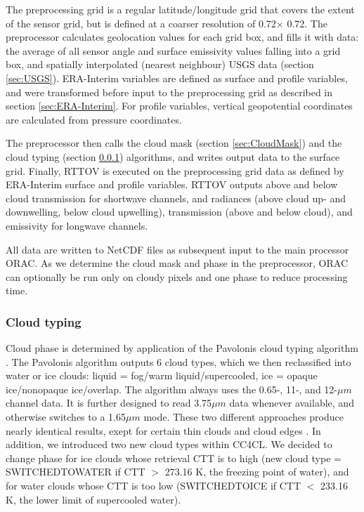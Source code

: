 The preprocessing grid is a regular latitude/longitude grid that covers the extent of the sensor grid, but is defined at a coarser resolution of 0.72\textdegree $\times$ 0.72\textdegree. The preprocessor calculates geolocation values for each grid box, and fills it with data: the average of all sensor angle and surface emissivity values falling into a grid box, and spatially interpolated (nearest neighbour) USGS data (section \ref{sec:USGS}). ERA-Interim variables are defined as surface and profile variables, and were transformed before input to the preprocessing grid as described in section \ref{sec:ERA-Interim}. For profile variables, vertical geopotential coordinates are calculated from pressure coordinates. 

The preprocessor then calls the cloud mask (section \ref{sec:CloudMask}) and the cloud typing (section \ref{sec:Pavolonis}) algorithms, and writes output data to the surface grid. Finally, RTTOV is executed on the preprocessing grid data as defined by ERA-Interim surface and profile variables. RTTOV outputs above and below cloud transmission for shortwave channels, and radiances (above cloud up- and downwelling, below cloud upwelling), transmission (above and below cloud), and emissivity for longwave channels.

All data are written to NetCDF files as subsequent input to the main processor ORAC. As we determine the cloud mask and phase in the preprocessor, ORAC can optionally be run only on cloudy pixels and one phase to reduce processing time.

\subsubsection{Cloud typing}\label{sec:Pavolonis}

Cloud phase is determined by application of the Pavolonis cloud typing algorithm \citep{Pavolonis05}. The Pavolonis algorithm outputs 6 cloud types, which we then reclassified into water or ice clouds: liquid = fog/warm liquid/supercooled, ice = opaque ice/nonopaque ice/overlap. The algorithm always uses the 0.65-, 11-, and 12-$\mu m$ channel data. It is further designed to read 3.75$\mu m$ data whenever available, and otherwise switches to a 1.65$\mu m$ mode. These two different approaches produce nearly identical results, exept for certain thin clouds and cloud edges \citep{Pavolonis05}. In addition, we introduced two new cloud types within CC4CL. We decided to change phase for ice clouds whose retrieval CTT is to high (new cloud type = SWITCHED\textunderscore TO\textunderscore WATER if CTT $>$ 273.16 K, the freezing point of water), and for water clouds whose CTT is too low (SWITCHED\textunderscore TO\textunderscore ICE if CTT $<$ 233.16 K, the lower limit of supercooled water).

